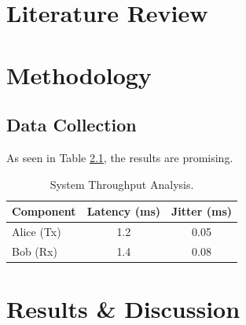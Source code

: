 \documentclass[12pt, a4paper]{report}
\begin{document}
\chapter{Literature Review}

\chapter{Methodology}
\section{Data Collection}
As seen in Table \ref{tab:data}, the results are promising.

\begin{table}[H]
    \centering
    \caption{System Throughput Analysis.}
    \label{tab:data}
    \begin{tabular}{l c c}
        \toprule
        \textbf{Component} & \textbf{Latency (ms)} & \textbf{Jitter (ms)} \\
        \midrule
        Alice (Tx)         & 1.2                   & 0.05                 \\
        Bob (Rx)           & 1.4                   & 0.08                 \\
        \bottomrule
    \end{tabular}
\end{table}




\chapter{Results \& Discussion}



\end{document}
